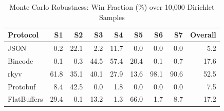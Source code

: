 \begin{table}[htbp]
\centering
\caption{Monte Carlo Robustness: Win Fraction (\%) over 10{,}000 Dirichlet Samples}
\label{tab:monte_carlo}
\begin{tabular}{lrrrrrrrr}
\hline
Protocol & S1 & S2 & S3 & S4 & S5 & S6 & S7 & Overall \\
\hline
  JSON & 0.2 & 22.1 & 2.2 & 11.7 & 0.0 & 0.0 & 0.0 & 5.2 \\
  Bincode & 0.1 & 0.3 & 44.5 & 57.4 & 20.4 & 0.1 & 0.7 & 17.6 \\
  rkyv & 61.8 & 35.1 & 40.1 & 27.9 & 13.6 & 98.1 & 90.6 & 52.5 \\
  Protobuf & 8.4 & 42.5 & 0.0 & 1.8 & 0.0 & 0.0 & 0.0 & 7.5 \\
  FlatBuffers & 29.4 & 0.1 & 13.2 & 1.3 & 66.0 & 1.7 & 8.7 & 17.2 \\
\hline
\end{tabular}
\end{table}